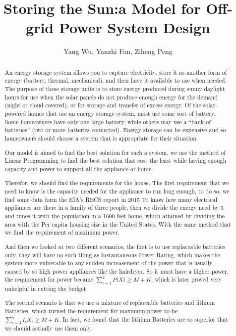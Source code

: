 \documentclass{article}
\title{Storing the Sun:a Model for Off-grid Power System Design}
\author{Yang Wu, Yanzhi Fan, Ziheng Peng}
\begin{document}
\Large
\maketitle
\begin{abstract}
    \Large An energy storage system allows you to capture electricity, store it as another form of energy (battery, thermal, mechanical),
    and then have it available to use when needed. The purpose of these storage units is to store energy produced during sunny daylight hours for use when the solar
    panels do not produce enough energy for the demand (night or cloud-covered), or for storage and transfer of excess energy. Of the solar-powered homes that use an energy storage system,
    most use some sort of battery. Some homeowners have only one large battery, while others may use a “bank of batteries” (two or more batteries connected). Energy storage can be expensive
    and so homeowners should choose a system that is appropriate for their situation \par
    Our model is aimed to find the best solution for such a system, we use the method of Linear Programming to find the best solution that
    cost the least while having enough capacity and power to support all the appliance at home.\par
    Therefor, we should find the requirements for the house. The first requirement that we need to know
    is the capacity needed for the appliance to run long enough, to do so, we find some data form the
    EIA's RECS report in 2015 To
    know how many electrical appliances are there in a family of three people, then we divide the energy need by
    3 and times it with the population in a 1600 feet home, which attained by dividing the area with the
    Per capita housing size in the United States. With the same method that we find the requirement
    of maximum power.\par
    And then we looked at two different scenarios, the first is to use replaceable  batteries only,
    they will have no such thing as Instantaneous Power Rating, which makes the system more vulnerable
    to any sudden increasement  of the power that is usually caused by so high power appliances like
    the hairdryer. So it must have a higher power, the requirement for power became $\sum_{i=1}^2PiXi\geq M+K$, which is later proved very unhelpful in cutting the budget\par
    The second scenario is that we use a mixture of replaceable batteries and lithium Batteries, which
    turned the requirement for maximum power to be $\sum_{i=3}^5I_iX_i\geq M+K$. In fact, we found that the lithium Batteries are so superior that we should actually use them only.\par

\end{abstract}
\end{document}
